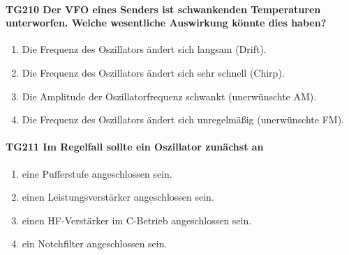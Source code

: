 \documentclass[8pt]{article}
\begin{document}
\paragraph*{TG210 Der VFO eines Senders ist schwankenden Temperaturen unterworfen. Welche wesentliche Auswirkung könnte dies haben?}
\begin{enumerate}[nolistsep,label=\Alph*]
\item Die Frequenz des Oszillators ändert sich langsam (Drift).
\item Die Frequenz des Oszillators ändert sich sehr schnell (Chirp).
\item Die Amplitude der Oszillatorfrequenz schwankt (unerwünschte AM).
\item Die Frequenz des Oszillators ändert sich unregelmäßig (unerwünschte FM).
\end{enumerate}

\paragraph*{TG211 Im Regelfall sollte ein Oszillator zunächst an} 
\begin{enumerate}[nolistsep,label=\Alph*]
\item eine Pufferstufe angeschlossen sein.
\item einen Leistungsverstärker angeschlossen sein. 
\item einen HF-Verstärker im C-Betrieb angeschlossen sein.
\item ein Notchfilter angeschlossen sein.
\end{enumerate}
\end{document}
